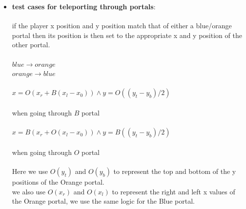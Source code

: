 \documentclass{article}
\begin{document}
\begin{itemize}
		\item {\large \textbf{test cases for teleporting through portals}:} \\ \\
			if the player x position and y position match that of either a blue/orange portal
			then its position is then set to the appropriate x and y position of the other portal. \\ \\
			$blue \to orange$ \\
			$orange \to blue$ \\ \\
			$x = O(x_r + B(x_l - x_0)) \land y = O((y_t - y_b)/2)$  \\ \\
			when going through $B$ portal \\ \\
			$x = B(x_r + O(x_l - x_0)) \land y = B((y_t - y_b)/2)$ \\ \\
			when going through $O$ portal \\ \\
			Here we use $O(y_t)$ and $O(y_b)$ to represent the top and bottom of the y positions of the Orange portal. \\
			we also use $O(x_r)$ and $O(x_l)$ to represent the right and left x values of the Orange portal, we use the same logic for the Blue portal. \\
			

\end{itemize}
\end{document}
